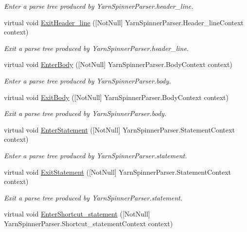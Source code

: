 \begin{DoxyCompactItemize}
\begin{DoxyCompactList}\small\item\em Enter a parse tree produced by Yarn\-Spinner\-Parser.\-header\-\_\-line. \end{DoxyCompactList}\item 
virtual void \hyperlink{a00196_a5565c81951adcedcdd6a5f1b0fff1dea}{Exit\-Header\-\_\-line} (\mbox{[}Not\-Null\mbox{]} Yarn\-Spinner\-Parser.\-Header\-\_\-line\-Context context)
\begin{DoxyCompactList}\small\item\em Exit a parse tree produced by Yarn\-Spinner\-Parser.\-header\-\_\-line. \end{DoxyCompactList}\item 
virtual void \hyperlink{a00196_a0bb84237855d76cd67c0214afeaece3c}{Enter\-Body} (\mbox{[}Not\-Null\mbox{]} Yarn\-Spinner\-Parser.\-Body\-Context context)
\begin{DoxyCompactList}\small\item\em Enter a parse tree produced by Yarn\-Spinner\-Parser.\-body. \end{DoxyCompactList}\item 
virtual void \hyperlink{a00196_ab0f6c8acd95f6213546c6f1f8370fd67}{Exit\-Body} (\mbox{[}Not\-Null\mbox{]} Yarn\-Spinner\-Parser.\-Body\-Context context)
\begin{DoxyCompactList}\small\item\em Exit a parse tree produced by Yarn\-Spinner\-Parser.\-body. \end{DoxyCompactList}\item 
virtual void \hyperlink{a00196_a0a1a5165215f2eed1a2fdee94218c472}{Enter\-Statement} (\mbox{[}Not\-Null\mbox{]} Yarn\-Spinner\-Parser.\-Statement\-Context context)
\begin{DoxyCompactList}\small\item\em Enter a parse tree produced by Yarn\-Spinner\-Parser.\-statement. \end{DoxyCompactList}\item 
virtual void \hyperlink{a00196_a94c70caf87bdc4c46223b1bfc9031c42}{Exit\-Statement} (\mbox{[}Not\-Null\mbox{]} Yarn\-Spinner\-Parser.\-Statement\-Context context)
\begin{DoxyCompactList}\small\item\em Exit a parse tree produced by Yarn\-Spinner\-Parser.\-statement. \end{DoxyCompactList}\item 
virtual void \hyperlink{a00196_a928af133a0075061959dc54bbcf0d006}{Enter\-Shortcut\-\_\-statement} (\mbox{[}Not\-Null\mbox{]} Yarn\-Spinner\-Parser.\-Shortcut\-\_\-statement\-Context context)

\end{DoxyCompactItemize}
